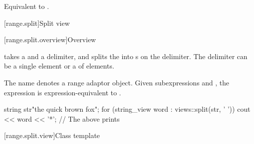 \begin{itemdescr}
\pnum
\effects
Equivalent to
.
\end{itemdescr}

[range.split]{Split view}

[range.split.overview]{Overview}

\pnum
{} takes a  and a delimiter, and
splits the  into s on the delimiter.
The delimiter can be a single element or a  of elements.

\pnum
The name  denotes
a range adaptor object.
Given subexpressions  and ,
the expression  is expression-equivalent to
.

\pnum
\begin{example}
\begin{codeblock}
string str{"the quick brown fox"};
for (string_view word : views::split(str, ' ')) {
  cout << word << '*';
}
// The above prints 
\end{codeblock}
\end{example}

[range.split.view]{Class template }

